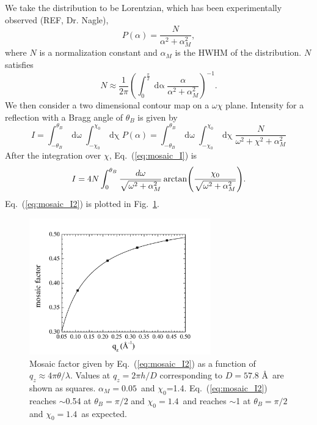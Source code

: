We take the distribution to be Lorentzian, which has been experimentally
observed (REF, Dr. Nagle),
\begin{equation}
  P(\alpha) = \frac{N}{\alpha^2+\alpha_M^2},
\end{equation}
where $N$ is a normalization constant and $\alpha_M$ is the HWHM of the 
distribution. $N$ satisfies
\begin{equation}
  N \approx \frac{1}{2\pi}\left(\int_0^{\frac{\pi}{2}}\mathop{d\alpha}
  \frac{\alpha}{\alpha^2+\alpha_M^2}\right)^{-1}.
  \label{eq:mosaic_N}
\end{equation}
We then consider a two dimensional contour map on a $\omega\chi$ plane.
Intensity for a reflection with a Bragg angle of $\theta_B$ is
given by
\begin{equation}
  I = \int_{-\theta_B}^{\theta_B}\mathop{d\omega} 
  \int_{-\chi_0}^{\chi_0}\mathop{d\chi} P(\alpha)
  = \int_{-\theta_B}^{\theta_B}\mathop{d\omega}
  \int_{-\chi_0}^{\chi_0}\mathop{d\chi}
  \frac{N}{\omega^2+\chi^2+\alpha_M^2}
  \label{eq:mosaic_I}
\end{equation}
After the integration over $\chi$, Eq.~(\ref{eq:mosaic_I}) is
\begin{equation}
  I = 4N\int_0^{\theta_B}\frac{d\omega}{\sqrt{\omega^2+\alpha_M^2}}
  \arctan\mathopen{}\left( \frac{\chi_0}{\sqrt{\omega^2+\alpha_M^2}} \right)\mathclose{}.
  \label{eq:mosaic_I2}
\end{equation}
Eq.~(\ref{eq:mosaic_I2}) is plotted in Fig.~\ref{fig:mosaic_correction}.

\begin{figure}
  \centering
  \includegraphics[width=0.7\textwidth]{figures/ripple/analysis/mosaic_correction}
  \caption[Mosaic factor given by Eq.~(\ref{eq:mosaic_I2}) as a function of 
  $q_z\approx 4\pi\theta/\lambda$]{Mosaic factor given by 
  Eq.~(\ref{eq:mosaic_I2}) as a function of 
  $q_z\approx 4\pi\theta/\lambda$. Values at $q_z=2\pi h/D$ corresponding 
  to $D=57.8$ \AA\ are shown as squares. $\alpha_M=0.05$\textdegree\ and 
  $\chi_0$=1.4\textdegree. Eq.~(\ref{eq:mosaic_I2}) reaches $\sim$0.54 at 
  $\theta_B=\pi/2$ and $\chi_0=1.4$\textdegree\ and reaches $\sim$1 at
  $\theta_B=\pi/2$ and $\chi_0=1.4$\textdegree\ as expected.}
  \label{fig:mosaic_correction}
\end{figure}


